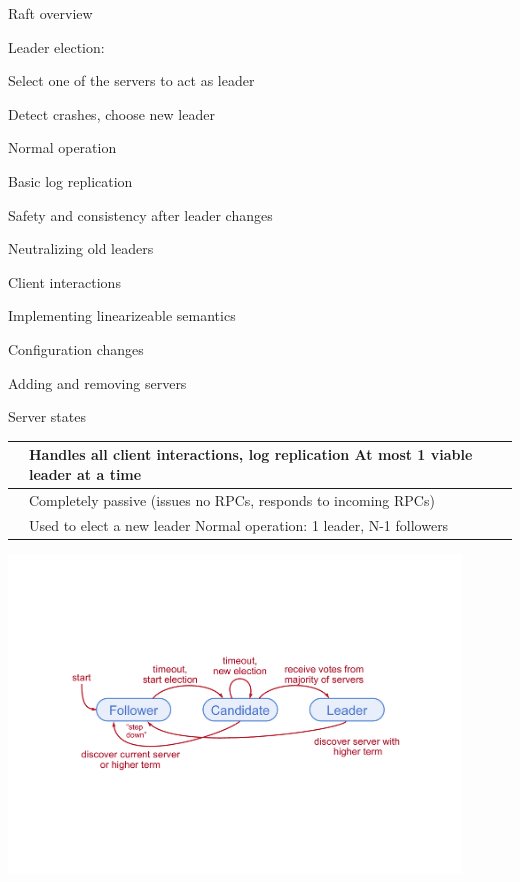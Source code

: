 \begin{}

\begin{frame}{Raft overview}
	
\BEL
\item Leader election:
	\BI
	\item Select one of the servers to act as leader
	\item Detect crashes, choose new leader
	\EI
\item Normal operation 
	\BI
	\item Basic log replication
	\EI
\item Safety and consistency after leader changes
\item Neutralizing old leaders
\item Client interactions
	\BI
	\item Implementing linearizeable semantics
	\EI
\item Configuration changes
	\BI
	\item Adding and removing servers
	\EI
\EEL

\end{frame}

\begin{frame}{Server states}

\begin{tabular}{| P{2cm} | P{9cm} | }
\hline
{} & Handles all client interactions, log replication \newline
At most 1 viable leader at a time\\\hline
{} & Completely passive (issues no RPCs, responds to incoming RPCs)\\\hline
{} & Used to elect a new leader\newline
Normal operation: 1 leader, N-1 followers\\\hline
\end{tabular}

\bigskip
\begin{center}
\includegraphics[width=0.90\textwidth]{states.pdf}
\end{center}
\end{frame}


\end{}
